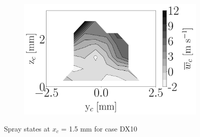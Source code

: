 \begin{figure}[h!]
\begin{subfigure}[b]{0.3\textwidth}
   \includegraphics[scale=\scaleSLIBIMER]{./part3_applications/figures_ch8_resolved/injectors_SLI/dx10_xD05p00_uz_mean_map}
\end{subfigure}
\caption{Spray states at $x_c$ = 1.5 mm for case DX10}
\label{fig:injectors_sli_BIMER_DX10_xD05}
\end{figure}




